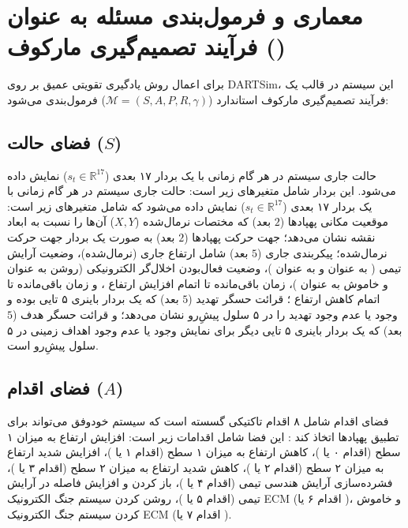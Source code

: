 \documentclass[oneside,openany,a4paper,12pt,draft]{article}
\begin{document}
\section{معماری و فرمول‌بندی مسئله به عنوان فرآیند تصمیم‌گیری مارکوف ()}
برای اعمال روش یادگیری تقویتی عمیق بر روی DARTSim، این سیستم در قالب یک فرآیند تصمیم‌گیری مارکوف استاندارد ($\mathcal{M} = (S, A, P, R, \gamma)$) فرمول‌بندی می‌شود:

\subsection{فضای حالت ($S$)}
حالت جاری سیستم در هر گام زمانی با یک بردار ۱۷ بعدی ($s_t \in \mathbb{R}^{17}$) نمایش داده می‌شود. این بردار شامل متغیرهای زیر است:
حالت جاری سیستم در هر گام زمانی با یک بردار ۱۷ بعدی ($s_t \in \mathbb{R}^{17}$) نمایش داده می‌شود که شامل متغیرهای زیر است: موقعیت مکانی پهپادها ($2$ بعد) که مختصات نرمال‌شده ($X, Y$) آن‌ها را نسبت به ابعاد نقشه نشان می‌دهد؛ جهت حرکت پهپادها ($2$ بعد) به صورت یک بردار جهت حرکت نرمال‌شده؛ پیکربندی جاری ($5$ بعد) شامل ارتفاع جاری (نرمال‌شده)، وضعیت آرایش تیمی ( به عنوان  و  به عنوان )، وضعیت فعال‌بودن اخلال‌گر الکترونیکی  (روشن به عنوان  و خاموش به عنوان )، زمان باقی‌مانده تا اتمام افزایش ارتفاع ، و زمان باقی‌مانده تا اتمام کاهش ارتفاع ؛ قرائت حسگر تهدید ($5$ بعد) که یک بردار باینری ۵ تایی بوده و وجود یا عدم وجود تهدید را در ۵ سلول پیشِ‌رو نشان می‌دهد؛ و قرائت حسگر هدف ($5$ بعد) که یک بردار باینری ۵ تایی دیگر برای نمایش وجود یا عدم وجود اهداف زمینی در ۵ سلول پیشِ‌رو است.

\subsection{فضای اقدام ($A$)}
فضای اقدام شامل ۸ اقدام تاکتیکی گسسته است که سیستم خودوفق می‌تواند برای تطبیق پهپادها اتخاذ کند :
این فضا شامل اقدامات زیر است: افزایش ارتفاع به میزان ۱ سطح (اقدام ۰ یا )، کاهش ارتفاع به میزان ۱ سطح (اقدام ۱ یا )، افزایش شدید ارتفاع به میزان ۲ سطح (اقدام ۲ یا )، کاهش شدید ارتفاع به میزان ۲ سطح (اقدام ۳ یا )، فشرده‌سازی آرایش هندسی تیمی (اقدام ۴ یا )، باز کردن و افزایش فاصله در آرایش تیمی (اقدام ۵ یا )، روشن کردن سیستم جنگ الکترونیک ECM (اقدام ۶ یا )، و خاموش کردن سیستم جنگ الکترونیک ECM (اقدام ۷ یا ).
\end{document}
